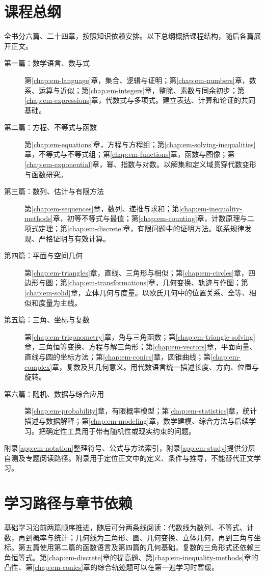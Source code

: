 \section*{课程总纲}
全书分六篇、二十四章，按照知识依赖安排。以下总纲概括课程结构，随后各篇展开正文。
\begin{description}
  \item[第一篇：数学语言、数与式]
  第\ref{chap:em-language}章，集合、逻辑与证明；第\ref{chap:em-numbers}章，数系、运算与近似；第\ref{chap:em-integers}章，整除、素数与同余初步；第\ref{chap:em-expressions}章，代数式与多项式。建立表达、计算和论证的共同基础。
  \item[第二篇：方程、不等式与函数]
  第\ref{chap:em-equations}章，方程与方程组；第\ref{chap:em-solving-inequalities}章，不等式与不等式组；第\ref{chap:em-functions}章，函数与图像；第\ref{chap:em-exponential}章，幂、指数与对数。以解集和定义域贯穿代数变形与函数研究。
  \item[第三篇：数列、估计与有限方法]
  第\ref{chap:em-sequences}章，数列、递推与求和；第\ref{chap:em-inequality-methods}章，初等不等式与最值；第\ref{chap:em-counting}章，计数原理与二项式定理；第\ref{chap:em-discrete}章，有限问题中的证明方法。联系规律发现、严格证明与有效计算。
  \item[第四篇：平面与空间几何]
  第\ref{chap:em-triangles}章，直线、三角形与相似；第\ref{chap:em-circles}章，四边形与圆；第\ref{chap:em-transformations}章，几何变换、轨迹与作图；第\ref{chap:em-solid}章，立体几何与度量。以欧氏几何中的位置关系、全等、相似和度量为主线。
  \item[第五篇：三角、坐标与复数]
  第\ref{chap:em-trigonometry}章，角与三角函数；第\ref{chap:em-triangle-solving}章，三角恒等变换、方程与解三角形；第\ref{chap:em-vectors}章，平面向量、直线与圆的坐标方法；第\ref{chap:em-conics}章，圆锥曲线；第\ref{chap:em-complex}章，复数及其几何意义。用代数语言统一描述长度、方向、位置与旋转。
  \item[第六篇：随机、数据与综合应用]
  第\ref{chap:em-probability}章，有限概率模型；第\ref{chap:em-statistics}章，统计描述与数据解释；第\ref{chap:em-modeling}章，数学建模、综合方法与后续学习。把确定性工具用于带有随机性或现实约束的问题。
\end{description}
附录\ref{app:em-notation}整理符号、公式与方法索引，附录\ref{app:em-study}提供分层自测及专题阅读路径。附录用于定位正文中的定义、条件与推导，不能替代正文学习。

\section*{学习路径与章节依赖}
基础学习沿前两篇顺序推进，随后可分两条线阅读：代数线为数列、不等式、计数，再到概率与统计；几何线为三角形、圆、几何变换、立体几何，再到三角与坐标。第五篇使用第二篇的函数语言及第四篇的几何基础，复数的三角形式还依赖三角恒等式。第\ref{chap:em-discrete}章的提高题、第\ref{chap:em-inequality-methods}章的凸性、第\ref{chap:em-conics}章的综合轨迹题可以在第一遍学习时暂缓。

